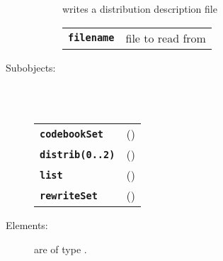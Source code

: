 \begin{description}
\begin{description}
        writes a distribution description file

      \begin{tabular}{ll}
 \texttt{\textbf{filename}} &  file to read from  \\
      \end{tabular}
    \end{description}

  \item[Subobjects:] \hfill \\
\ 
    \begin{tabular}{ll}
      \texttt{\textbf{codebookSet}} & (\Jref{module}{CodebookSet}) \\
      \texttt{\textbf{distrib(0..2)}} & (\Jref{module}{}) \\
      \texttt{\textbf{list}} & (\Jref{module}{List}) \\
      \texttt{\textbf{rewriteSet}} & (\Jref{module}{???}) \\
    \end{tabular}
\vspace{3mm}

  \item[Elements:] are of type .


\end{description}

